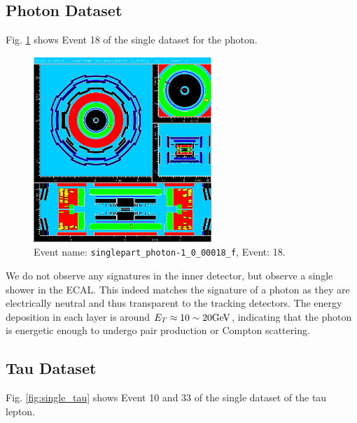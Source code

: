 \documentclass[a4paper]{report}
\numberwithin{equation}{section}
\begin{document}
\subsection{Photon Dataset}

Fig. \ref{fig:single_photon} shows Event 18 of the single dataset for the photon.

\begin{figure}[htpb]
    \centering
    \includegraphics[width=0.6\textwidth]{photon_event18.eps}
    \caption{Event name: \texttt{singlepart\_photon-1\_0\_00018\_f}, Event: 18. }
    \label{fig:single_photon}
\end{figure}

We do not observe any signatures in the inner detector, but observe a single shower in the ECAL. This indeed matches the signature 
of a photon as they are electrically neutral and thus transparent to the tracking detectors. The energy deposition in each 
layer is around $E_T \approx 10 \sim 20 \si[]{\giga\electronvolt}$, indicating that the photon is energetic enough to undergo 
pair production or Compton scattering. \par 

\subsection{Tau Dataset}

Fig. \ref{fig:single_tau} shows Event 10 and 33 of the single dataset of the tau lepton. 
\end{document}
